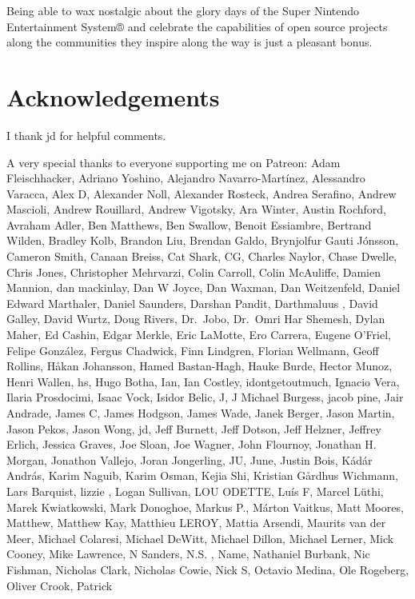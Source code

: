 \documentclass[
  letterpaper,
  DIV=11,
  numbers=noendperiod]{scrartcl}
\begin{document}
Being able to wax nostalgic about the glory days of the Super Nintendo
Entertainment System® and celebrate the capabilities of open source
projects along the communities they inspire along the way is just a
pleasant bonus.

\section*{Acknowledgements}\label{acknowledgements}

I thank jd for helpful comments.

A very special thanks to everyone supporting me on Patreon: Adam
Fleischhacker, Adriano Yoshino, Alejandro Navarro-Martínez, Alessandro
Varacca, Alex D, Alexander Noll, Alexander Rosteck, Andrea Serafino,
Andrew Mascioli, Andrew Rouillard, Andrew Vigotsky, Ara Winter, Austin
Rochford, Avraham Adler, Ben Matthews, Ben Swallow, Benoit Essiambre,
Bertrand Wilden, Bradley Kolb, Brandon Liu, Brendan Galdo, Brynjolfur
Gauti Jónsson, Cameron Smith, Canaan Breiss, Cat Shark, CG, Charles
Naylor, Chase Dwelle, Chris Jones, Christopher Mehrvarzi, Colin Carroll,
Colin McAuliffe, Damien Mannion, dan mackinlay, Dan W Joyce, Dan Waxman,
Dan Weitzenfeld, Daniel Edward Marthaler, Daniel Saunders, Darshan
Pandit, Darthmaluus , David Galley, David Wurtz, Doug Rivers, Dr.~Jobo,
Dr.~Omri Har Shemesh, Dylan Maher, Ed Cashin, Edgar Merkle, Eric
LaMotte, Ero Carrera, Eugene O'Friel, Felipe González, Fergus Chadwick,
Finn Lindgren, Florian Wellmann, Geoff Rollins, Håkan Johansson, Hamed
Bastan-Hagh, Hauke Burde, Hector Munoz, Henri Wallen, hs, Hugo Botha,
Ian, Ian Costley, idontgetoutmuch, Ignacio Vera, Ilaria Prosdocimi,
Isaac Vock, Isidor Belic, J, J Michael Burgess, jacob pine, Jair
Andrade, James C, James Hodgson, James Wade, Janek Berger, Jason Martin,
Jason Pekos, Jason Wong, jd, Jeff Burnett, Jeff Dotson, Jeff Helzner,
Jeffrey Erlich, Jessica Graves, Joe Sloan, Joe Wagner, John Flournoy,
Jonathan H. Morgan, Jonathon Vallejo, Joran Jongerling, JU, June, Justin
Bois, Kádár András, Karim Naguib, Karim Osman, Kejia Shi, Kristian
Gårdhus Wichmann, Lars Barquist, lizzie , Logan Sullivan, LOU ODETTE,
Luís F, Marcel Lüthi, Marek Kwiatkowski, Mark Donoghoe, Markus P.,
Márton Vaitkus, Matt Moores, Matthew, Matthew Kay, Matthieu LEROY,
Mattia Arsendi, Maurits van der Meer, Michael Colaresi, Michael DeWitt,
Michael Dillon, Michael Lerner, Mick Cooney, Mike Lawrence, N Sanders,
N.S. , Name, Nathaniel Burbank, Nic Fishman, Nicholas Clark, Nicholas
Cowie, Nick S, Octavio Medina, Ole Rogeberg, Oliver Crook, Patrick
\end{document}
